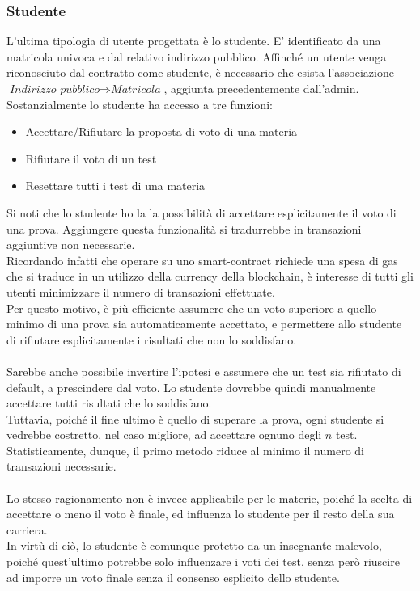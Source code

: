 \pagebreak

\subsubsection{Studente}
L'ultima tipologia di utente progettata è lo studente. E' identificato da una matricola univoca e dal relativo indirizzo pubblico. Affinché un utente venga riconosciuto dal contratto come studente, è necessario che esista l'associazione $\textit{Indirizzo pubblico} \Rightarrow \textit{Matricola}$, aggiunta precedentemente dall'admin.
Sostanzialmente lo studente ha accesso a tre funzioni:
\begin{itemize}
    \item Accettare/Rifiutare la proposta di voto di una materia
    \item Rifiutare il voto di un test
    \item Resettare tutti i test di una materia
\end{itemize}

Si noti che lo studente ho la la possibilità di accettare esplicitamente il voto di una prova.
Aggiungere questa funzionalità si tradurrebbe in transazioni aggiuntive non necessarie. \\
Ricordando infatti che operare su uno \gls{smart-contract} richiede una spesa di gas che si traduce in un utilizzo della currency della blockchain,
è interesse di tutti gli utenti minimizzare il numero di transazioni effettuate. \\
Per questo motivo, è più efficiente assumere che un voto superiore a quello minimo di una prova sia automaticamente accettato,
e permettere allo studente di rifiutare esplicitamente i risultati che non lo soddisfano. \\
\\
Sarebbe anche possibile invertire l'ipotesi e assumere che un test sia rifiutato di default, a prescindere dal voto.
Lo studente dovrebbe quindi manualmente accettare tutti risultati che lo soddisfano. \\
Tuttavia, poiché il fine ultimo è quello di superare la prova, ogni studente si vedrebbe costretto,
nel caso migliore, ad accettare ognuno degli $n$ test. \\
Statisticamente, dunque, il primo metodo riduce al minimo il numero di transazioni necessarie. \\
\\
Lo stesso ragionamento non è invece applicabile per le materie, poiché la scelta di accettare o meno il voto è finale,
ed influenza lo studente per il resto della sua carriera. \\
In virtù di ciò, lo studente è comunque protetto da un insegnante malevolo, poiché quest'ultimo potrebbe solo influenzare
i voti dei test, senza però riuscire ad imporre un voto finale senza il consenso esplicito dello studente.

